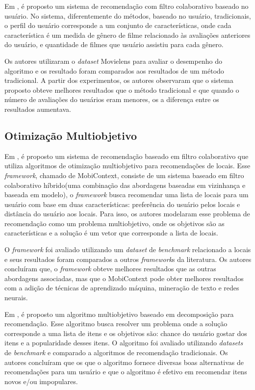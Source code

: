 Em \cite{uyangoda2018user}, é proposto um sistema de recomendação com filtro colaborativo baseado no usuário. No sistema, diferentemente do métodos, baseado no usuário, tradicionais, o perfil do usuário corresponde a um conjunto de características, onde cada característica é um medida de gênero de filme relacionado às avaliações anteriores do usuário, e quantidade de filmes que usuário assistiu para cada gênero. 

Os autores utilizaram o \textit{dataset} Movielens para avaliar o desempenho do algoritmo e os resultado foram comparados aos resultados de um método tradicional. A partir dos experimentos, os autores observaram que o sistema proposto obteve melhores resultados que o método tradicional e que quando o número de avaliações do usuários eram menores, os a diferença entre os resultados aumentava.  

\subsection{Otimização Multiobjetivo}
Em \cite{irfan2015mobicontext}, é proposto um sistema de recomendação baseado em filtro colaborativo que utiliza algoritmos de otimização multiobjetivo para recomendações de locais. Esse \textit{framework},  chamado de MobiContext, consiste de um sistema baseado em filtro colaborativo híbrido(uma combinação das abordagens baseadas em vizinhança e baseada em modelo), o \textit{framework} busca recomendar uma lista de locais para um usuário com base em duas características: preferência do usuário pelos locais e distância do usuário aos locais. Para isso, os autores modelaram esse problema de recomendação como um problema multiobjetivo, onde os objetivos são as características e a solução é um vetor que corresponde a lista de locais. 

O \textit{framework} foi avaliado utilizando um \textit{dataset} de \textit{benchmark} relacionado a locais e seus resultados foram comparados a outros \textit{framework}s da literatura. Os autores concluíram que, o \textit{framework} obteve melhores resultados que as outras abordagens associadas, mas que o MobiContext pode obter melhores resultados com a adição de técnicas de aprendizado máquina, mineração de texto e redes neurais.

Em \cite{wang2014decomposition}, é proposto um algoritmo multiobjetivo baseado em decomposição para recomendação. Esse algoritmo busca resolver um problema onde a solução corresponde a uma lista de itens  e os objetivos são: chance do  usuário gostar dos itens e a popularidade desses itens. O algoritmo foi avaliado utilizando \textit{datasets} de \textit{benchmark} e comparado a algoritmos de recomendação tradicionais. Os autores concluíram que os que o algoritmo fornece diversas boas alternativas de recomendações para um usuário e que o algoritmo é efetivo em recomendar itens novos e/ou impopulares.

